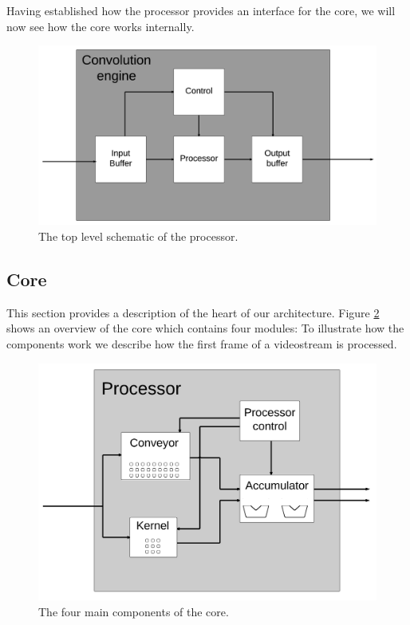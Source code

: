 Having established how the processor provides an interface for the core, we will now see how the core works internally.

\begin{figure}[h!]
    \includegraphics[width=\linewidth]{img/convolution_engine.png}
    \caption{The top level schematic of the processor.}
    \label{fig:conv_engine}
\end{figure}

\subsection{Core}
This section provides a description of the heart of our architecture.
Figure \ref{fig:convolution_processor} shows an overview of the core which contains four modules:
To illustrate how the components work we describe how the first frame of a videostream is processed.

\begin{figure}[h!]
    \includegraphics[width=\linewidth]{img/processor_small.png}
    \caption{The four main components of the core.}
    \label{fig:convolution_processor}
\end{figure}

